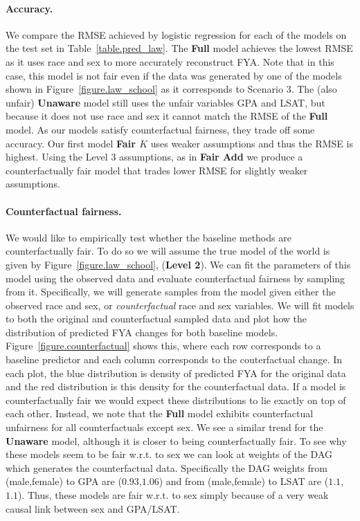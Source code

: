 \paragraph{Accuracy.}
We compare the RMSE achieved by logistic regression for each of the
models on the test set in Table~\ref{table.pred_law}.  The
\textbf{Full} model achieves the lowest RMSE as it uses race and sex
to more accurately reconstruct FYA. Note that in this case, this model
is not fair even if the data was generated by one of the models shown
in Figure~\ref{figure.law_school} as it corresponds to Scenario 3. The
(also unfair) \textbf{Unaware} model still uses the unfair variables
GPA and LSAT, but because it does not use race and sex it cannot match
the RMSE of the \textbf{Full} model. As our models satisfy
counterfactual fairness, they trade off some accuracy. Our first model
\textbf{Fair $K$} uses weaker assumptions and thus the RMSE is
highest. Using the Level 3 assumptions, as in \textbf{Fair Add} we
produce a counterfactually fair model that trades lower RMSE for
slightly weaker assumptions.


\paragraph{Counterfactual fairness.}
We would like to empirically test whether the baseline methods are
counterfactually fair. To do so we will assume the true model of the
world is given by Figure~\ref{figure.law_school}, (\textbf{Level
  2}). We can fit the parameters of this model using the observed data
and evaluate counterfactual fairness by sampling from
it. Specifically, we will generate samples from the model given either
the observed race and sex, or \emph{counterfactual} race and sex
variables. We will fit models to both the original and counterfactual
sampled data and plot how the distribution of predicted FYA changes
for both baseline models. Figure~\ref{figure.counterfactual} shows
this, where each row corresponds to a baseline predictor and each
column corresponds to the couterfactual change. In each plot, the blue
distribution is density of predicted FYA for the original data and the
red distribution is this density for the counterfactual data. If a
model is counterfactually fair we would expect these distributions to
lie exactly on top of each other. Instead, we note that the
\textbf{Full} model exhibits counterfactual unfairness for all
counterfactuals except sex. We see a similar trend for the
\textbf{Unaware} model, although it is closer to being
counterfactually fair. To see why these models seem to be fair
w.r.t. to sex we can look at weights of the DAG which generates the
counterfactual data. Specifically the DAG weights from (male,female)
to GPA are ($0.93$,$1.06$) and from (male,female) to LSAT are
($1.1$,$1.1$). Thus, these models are fair w.r.t. to sex simply
because of a very weak causal link between sex and GPA/LSAT.

